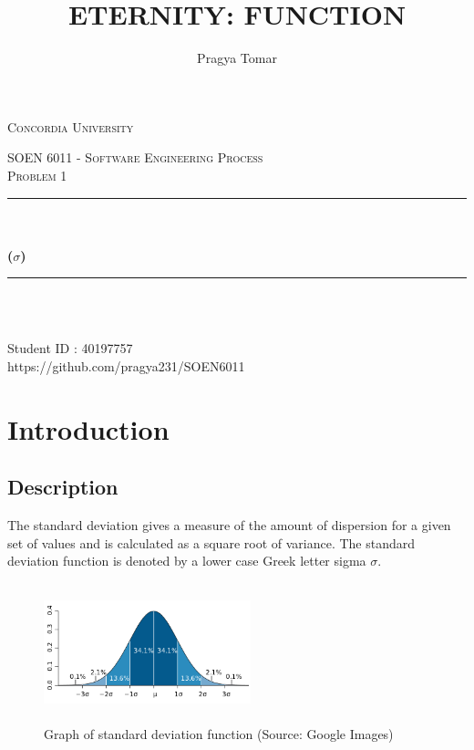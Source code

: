 \documentclass[10pt]{report}
\title{ETERNITY: FUNCTION}
\author{Pragya Tomar}
\date{}
\makeatletter
\let\thetitle\@title
\let\theauthor\@author
\makeatother
\begin{document}
\begin{titlepage}
	\centering
    \vspace*{1 cm}
\begin{center}    \textsc{\Large Concordia University}\\[2.5 cm]	\end{center}
	\textsc{\Large  SOEN 6011 - Software Engineering Process }\\[1 cm]
	\textsc{\Large Problem 1}
	\rule{\linewidth}{0.5 mm} \\[0.4 cm]
	{ \huge \textbf \thetitle}\\[0.5 cm]
	{ \huge \textbf{($\sigma$)}}
	\rule{\linewidth}{0.5 mm} \\[1.0 cm]

	
\begin{center}   {\Large \textbf{\theauthor}} \\[1 cm]
                 {\large Student ID : 40197757 }\\[0.4 cm]
                 {\large https://github.com/pragya231/SOEN6011}
\end{center}
	
\end{titlepage}

\tableofcontents
\pagebreak

\renewcommand{\thesection}{\arabic{section}}
\section{\Large \vspace{0.3 cm}Introduction}

\subsection{\Large \vspace{0.4 cm}Description}
The standard deviation gives a measure of the amount of dispersion for a given set of values and is calculated as a square root of variance. The standard deviation function is denoted by a lower case Greek letter sigma $\sigma$.

\begin{figure}[h!]
\begin{center}
  \includegraphics[width=6cm, height=4cm]{Standard_deviation_diagram.svg_.png}
  \end{center}
  \caption{Graph of standard deviation function (Source: Google Images)}
\end{figure}
\end{document}
